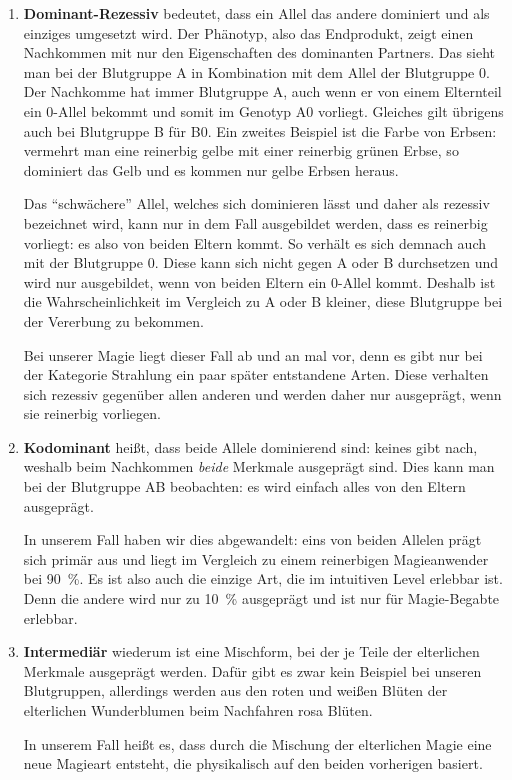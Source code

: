 \begin{enumerate}
	\item \textbf{Dominant-Rezessiv} bedeutet, dass ein Allel das andere dominiert und als einziges umgesetzt wird. 
	Der Phänotyp, also das Endprodukt, zeigt einen Nachkommen mit nur den Eigenschaften des dominanten Partners.
	Das sieht man bei der Blutgruppe A in Kombination mit dem Allel der Blutgruppe 0.
	Der Nachkomme hat immer Blutgruppe A, auch wenn er von einem Elternteil ein 0-Allel bekommt und somit im Genotyp A0 vorliegt.
	Gleiches gilt übrigens auch bei Blutgruppe B für B0.
	Ein zweites Beispiel ist die Farbe von Erbsen: vermehrt man eine reinerbig gelbe mit einer reinerbig grünen Erbse, so dominiert das Gelb und es kommen nur gelbe Erbsen heraus.
	
	Das "`schwächere"' Allel, welches sich dominieren lässt und daher als rezessiv bezeichnet wird, kann nur in dem Fall ausgebildet werden, dass es reinerbig vorliegt: es also von beiden Eltern kommt.
	So verhält es sich demnach auch mit der Blutgruppe 0.
	Diese kann sich nicht gegen A oder B durchsetzen und wird nur ausgebildet, wenn von beiden Eltern ein 0-Allel kommt.
	Deshalb ist die Wahrscheinlichkeit im Vergleich zu A oder B kleiner, diese Blutgruppe bei der Vererbung zu bekommen.
	
	Bei unserer Magie liegt dieser Fall ab und an mal vor, denn es gibt nur bei der Kategorie Strahlung ein paar später entstandene Arten.
	Diese verhalten sich rezessiv gegenüber allen anderen und werden daher nur ausgeprägt, wenn sie reinerbig vorliegen. 
	
	\item \textbf{Kodominant} heißt, dass beide Allele dominierend sind: keines gibt nach, weshalb beim Nachkommen \textit{beide}  Merkmale ausgeprägt sind.
	Dies kann man bei der Blutgruppe AB beobachten: es wird einfach alles von den Eltern ausgeprägt.
	
	In unserem Fall haben wir dies abgewandelt: eins von beiden Allelen prägt sich primär aus und liegt im Vergleich zu einem reinerbigen Magieanwender bei \SI{90}{\percent}.
	Es ist also auch die einzige Art, die im intuitiven Level erlebbar ist.
	Denn die andere wird nur zu \SI{10}{\percent} ausgeprägt und ist nur für Magie-Begabte erlebbar.
	
	\item \textbf{Intermediär} wiederum ist eine Mischform, bei der je Teile der elterlichen Merkmale ausgeprägt werden. 
	Dafür gibt es zwar kein Beispiel bei unseren Blutgruppen, allerdings werden aus den roten und weißen Blüten der elterlichen Wunderblumen beim Nachfahren rosa Blüten.
	
	In unserem Fall heißt es, dass durch die Mischung der elterlichen Magie eine neue Magieart entsteht, die physikalisch auf den beiden vorherigen basiert.
\end{enumerate}
